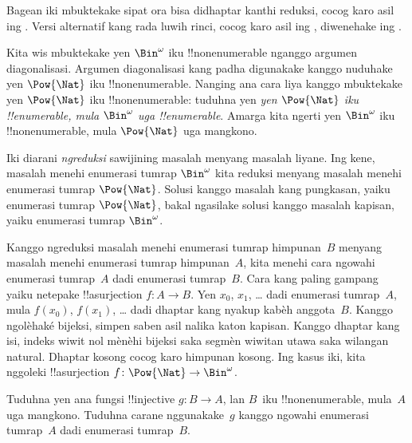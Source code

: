 \documentclass[../../../include/open-logic-section]{subfiles}
\begin{document}


\begin{editorial}
  Bagean iki mbuktekake sipat ora bisa didhaptar kanthi reduksi,
  cocog karo asil ing . Versi alternatif
  kang rada luwih rinci, cocog karo asil ing ,
  diwenehake ing .
\end{editorial}

Kita wis mbuktekake yen $\Bin^\omega$ iku !!{nonenumerable} nganggo
argumen diagonalisasi. Argumen diagonalisasi kang padha digunakake
kanggo nuduhake yen $\Pow{\Nat}$ iku !!{nonenumerable}.
Nanging ana cara liya kanggo mbuktekake yen $\Pow{\Nat}$ iku !!{nonenumerable}:
tuduhna yen \emph{yen $\Pow{\Nat}$ iku !!{enumerable}, mula $\Bin^\omega$
uga !!{enumerable}}. Amarga kita ngerti yen $\Bin^\omega$
iku !!{nonenumerable}, mula $\Pow{\Nat}$ uga mangkono.

Iki diarani \emph{ngreduksi} sawijining masalah menyang masalah liyane.
Ing kene, masalah menehi enumerasi tumrap $\Bin^\omega$ kita reduksi menyang
masalah menehi enumerasi tumrap $\Pow{\Nat}$. Solusi kanggo masalah kang
pungkasan, yaiku enumerasi tumrap $\Pow{\Nat}$, bakal ngasilake solusi
kanggo masalah kapisan, yaiku enumerasi tumrap $\Bin^\omega$.

Kanggo ngreduksi masalah menehi enumerasi tumrap himpunan~$B$ menyang masalah
menehi enumerasi tumrap himpunan~$A$, kita menehi cara ngowahi enumerasi
tumrap~$A$ dadi enumerasi tumrap~$B$. Cara kang paling gampang yaiku netepake
!!a{surjection} $f\colon A \to B$. Yen $x_0$, $x_1$, \dots{}
dadi enumerasi tumrap~$A$, mula $f(x_0)$, $f(x_1)$, \dots{} dadi
dhaptar kang nyakup kabèh anggota~$B$.
Kanggo ngolèhaké bijeksi, simpen saben asil nalika katon kapisan.
Kanggo dhaptar kang isi, indeks wiwit nol mènèhi bijeksi saka segmèn
wiwitan utawa saka wilangan natural. Dhaptar kosong cocog karo himpunan kosong.
Ing kasus iki, kita nggoleki !!a{surjection} $f\colon \Pow{\Nat}
\to \Bin^\omega$.

\begin{prob}
Tuduhna yen ana fungsi !!{injective} $g\colon B \to A$, lan
$B$~iku !!{nonenumerable}, mula~$A$ uga mangkono. Tuduhna carane
nggunakake~$g$ kanggo ngowahi enumerasi tumrap~$A$ dadi enumerasi tumrap~$B$.
\end{prob}
\end{document}
